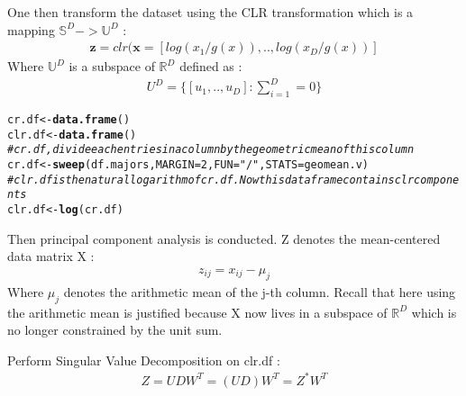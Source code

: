 \documentclass[a4paper,oneside,12pt,titlepage]{article}\usepackage[]{graphicx}\usepackage[]{color}
\makeatletter
\newcommand{\hlnum}[1]{\textcolor[rgb]{0.686,0.059,0.569}{#1}}%
\newcommand{\hlstr}[1]{\textcolor[rgb]{0.192,0.494,0.8}{#1}}%
\newcommand{\hlcom}[1]{\textcolor[rgb]{0.678,0.584,0.686}{\textit{#1}}}%
\newcommand{\hlstd}[1]{\textcolor[rgb]{0.345,0.345,0.345}{#1}}%
\newcommand{\hlkwb}[1]{\textcolor[rgb]{0.69,0.353,0.396}{#1}}%
\newcommand{\hlkwc}[1]{\textcolor[rgb]{0.333,0.667,0.333}{#1}}%
\newcommand{\hlkwd}[1]{\textcolor[rgb]{0.737,0.353,0.396}{\textbf{#1}}}%
\newenvironment{kframe}{%
 \def\at@end@of@kframe{}%
 \ifinner\ifhmode%
  \def\at@end@of@kframe{\end{minipage}}%
  \begin{minipage}{\columnwidth}%
 \fi\fi%
 \def\FrameCommand##1{\hskip\@totalleftmargin \hskip-\fboxsep
 \colorbox{shadecolor}{##1}\hskip-\fboxsep
     \hskip-\linewidth \hskip-\@totalleftmargin \hskip\columnwidth}%
 \MakeFramed {\advance\hsize-\width
   \@totalleftmargin\z@ \linewidth\hsize
   \@setminipage}}%
 {\par\unskip\endMakeFramed%
 \at@end@of@kframe}
\newenvironment{knitrout}{}{} %
\makeatother
\begin{document}
\noindent One then transform the dataset using the CLR transformation which is a mapping  $\mathbb{S}^D -> \mathbb{U}^D$ :
\begin{align}
\mathbf{z} = clr(\mathbf{x} = [log(x_1/g(x)),..,log(x_D/g(x))]
\end{align}
Where $\mathbb{U}^D$ is a subspace of $\mathbb{R}^D$ defined as : 
\begin{align*}
U^D = \Big\{[u_1,..,u_D] : \sum_{i=1}^D = 0  \Big\}
\end{align*}

\begin{knitrout}
\color{fgcolor}\begin{kframe}
\begin{alltt}
\hlstd{cr.df} \hlkwb{<-} \hlkwd{data.frame}\hlstd{()}
\hlstd{clr.df} \hlkwb{<-} \hlkwd{data.frame}\hlstd{()}
\hlcom{# cr.df, divide each entries in a column by the geometric mean of this column}
\hlstd{cr.df} \hlkwb{<-} \hlkwd{sweep}\hlstd{(df.majors,}\hlkwc{MARGIN} \hlstd{=} \hlnum{2}\hlstd{,}\hlkwc{FUN}\hlstd{=}\hlstr{"/"}\hlstd{,}\hlkwc{STATS} \hlstd{= geomean.v)}
\hlcom{# clr.df is the natural logarithm of cr.df. Now this dataframe contains clr components}
\hlstd{clr.df} \hlkwb{<-} \hlkwd{log}\hlstd{(cr.df)}
\end{alltt}
\end{kframe}
\end{knitrout}
Then principal component analysis is conducted.
Z denotes the mean-centered data matrix X :  
\begin{align*}
z_{ij} = x_{ij} - \mu_j
\end{align*}
Where $\mu_j$ denotes the arithmetic mean of the j-th column. Recall that here using the arithmetic mean is justified because X now lives in a subspace of $\mathbb{R}^D$ which is no longer constrained by the unit sum.

Perform Singular Value Decomposition on clr.df : 
\begin{align}
Z = UDW^T  = (UD)W^T = Z^{*}W^T
\end{align}
\end{document}
